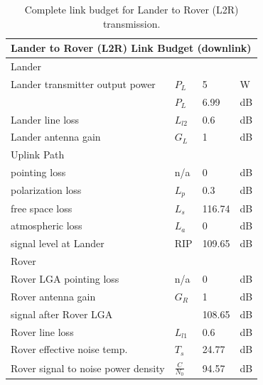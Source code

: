 \begin{table}[]
\centering
\caption{Complete link budget for Lander to Rover (L2R) transmission.}
\label{tab:lb-L2R}
\begin{tabular}{llll}
\multicolumn{4}{l}{Lander to Rover (L2R) Link Budget (downlink)}                 \\ \hline
\multicolumn{4}{l}{\cellcolor[HTML]{DAE8FC}Lander}                               \\
Lander transmitter output power           &${P}_{L}$		& 5                      & W    \\
                                          &${P}_{L}$		& 6.99                   & dB   \\
Lander line loss                          &${L}_{l2}$	& 0.6                    & dB   \\
Lander antenna gain                       &${G}_{L}$		& 1                      & dB   \\
\multicolumn{4}{l}{\cellcolor[HTML]{DAE8FC}Uplink Path}                          \\
pointing loss                             &n/a	    		& 0                      & dB   \\
polarization loss                         &${L}_{p}$		& 0.3                    & dB   \\
free space loss                           &${L}_{s}$		& 116.74                 & dB   \\
atmospheric loss                          &${L}_{a}$		& 0                      & dB   \\ \hline
signal level at Lander					  & RIP  & 109.65				  & dB   \\ 
\multicolumn{4}{l}{\cellcolor[HTML]{DAE8FC}Rover}                                \\
Rover LGA pointing loss                   &n/a	    		& 0                      & dB   \\
Rover antenna gain                        &${G}_{R}$		& 1                      & dB   \\ \hline
signal after Rover LGA                    &      		& 108.65                 & dB   \\ \hline
Rover line loss                     	      &${L}_{l1}$	& 0.6                    & dB   \\
Rover effective noise temp.               &${T}_{s}$ 	& 24.77                  & dB   \\ \hline
Rover signal to noise power density       & $\frac{C}{{N}_{0}}$	 & 94.57                  & dB   \\ \hline

\end{tabular}
\end{table}
